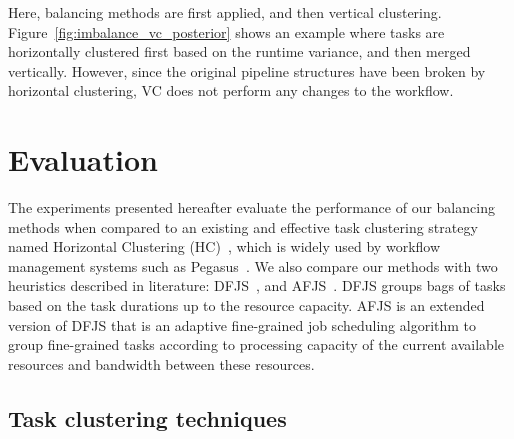 Here, balancing methods are first applied, and then vertical clustering. Figure~\ref{fig:imbalance_vc_posterior} shows an example where tasks are horizontally clustered first based on the runtime variance, and then merged vertically. However, since the original pipeline structures have been broken by horizontal clustering, VC does not perform any changes to the workflow. 










\section{Evaluation}
\label{sec:balance:experiments}

The experiments presented hereafter evaluate the performance of our balancing methods when compared to an existing and effective task clustering strategy named Horizontal Clustering (HC)~\cite{Singh2008}, which is widely used by workflow management systems such as Pegasus~\cite{Deelman2004}. We also compare our methods with two heuristics described in literature: DFJS~\cite{Muthuvelu2005}, and AFJS~\cite{Liu2009}. DFJS groups bags of tasks based on the task durations up to the resource capacity. AFJS is an extended version of DFJS that is an adaptive fine-grained job scheduling algorithm to group fine-grained tasks according to processing capacity of the current available resources and bandwidth between these resources.

\subsection{Task clustering techniques}

